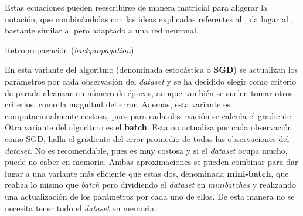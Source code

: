 		Estas ecuaciones pueden reescribirse de manera matricial para aligerar la notación, que combinándolas con las ideas explicadas referentes al , da lugar al , bastante similar al  pero adaptado a una red neuronal. \\
		
		\begin{algorithm}
			\DontPrintSemicolon
			
			\caption{Retropropagación (\textit{backpropagation})}
			\label{algo:backprop}
			
			
		\end{algorithm}
		
		En esta variante del algoritmo (denominada estocástica o \textbf{SGD}) se actualizan los parámetros por cada observación del \textit{dataset} y se ha decidido elegir como criterio de parada alcanzar un número de épocas, aunque también se suelen tomar otros criterios, como la magnitud del error. Además, esta variante es computacionalmente costosa, pues para cada observación se calcula el gradiente. Otra variante del algoritmo es el \textbf{batch}. Esta no actualiza por cada observación como SGD, halla el gradiente del error promedio de todas las observaciones del \textit{dataset}. No es recomendable, pues es muy costosa y si el \textit{dataset} ocupa mucho, puede no caber en memoria. Ambas aproximaciones se pueden combinar para dar lugar a una variante más eficiente que estas dos, denominada \textbf{mini-batch}, que realiza lo mismo que \textit{batch} pero dividiendo el \textit{dataset} en \textit{minibatches} y realizando una actualización de los parámetros por cada uno de ellos. De esta manera no se necesita tener todo el \textit{dataset} en memoria\cite{descenso}. 
		
